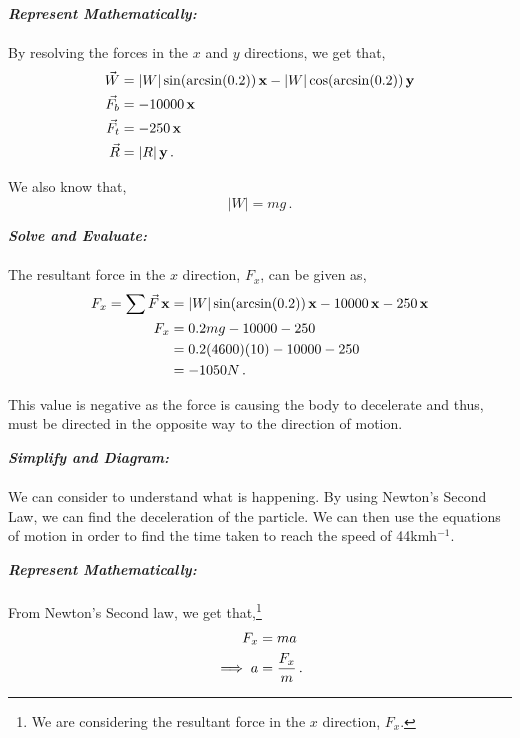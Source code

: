 \begin{subquestions}
\begin{subsubquestions}
\textbf{\textit{Represent Mathematically:}} \\ \\
By resolving the forces in the $x$ and $y$ directions, we get that,
\begin{align}
	\vec{W} & = |W|\sin(\arcsin(0.2))\,\mathbf{x} - |W|\cos(\arcsin(0.2))\,\mathbf{y} \nonumber \\
	\vec{F_b} & = -10000\,\mathbf{x} \nonumber \\
	\vec{F_t} & = -250\,\mathbf{x} \nonumber \\
	\vec{R} & = |R|\,\mathbf{y} \,.
\end{align}

We also know that,
\begin{equation}
	|W|=mg \,.
\end{equation}




\textbf{\textit{Solve and Evaluate:}} \\ \\
The resultant force in the $x$ direction, $F_x$, can be given as,
\begin{align}
	F_x = \sum \vec{F}\,\mathbf{x} & = |W|\sin(\arcsin(0.2))\,\mathbf{x} -10000\,\mathbf{x}-250\,\mathbf{x} \nonumber \\
	F_x & = 0.2mg -10000-250 \nonumber \\
	    & = 0.2(4600)(10) -10000-250 \nonumber \\
	    & = -1050 N \,.
\end{align}

This value is negative as the force is causing the body to decelerate and thus, must be directed in the opposite way to the direction of motion.


\subsubquestion
\textbf{\textit{Simplify and Diagram:}} \\ \\
We can consider  to understand what is happening. By using Newton's Second Law, we can find the deceleration of the particle. We can then use the equations of motion in order to find the time taken to reach the speed of 44kmh$^{-1}$.




\textbf{\textit{Represent Mathematically:}} \\ \\
From Newton's Second law, we get that,\footnote{We are considering the resultant force in the $x$ direction, $F_x$.}
\begin{align}
	F_x & = ma \nonumber \\
	\implies a & = \frac{F_x}{m} \,.
\end{align}


\end{subsubquestions}
\end{subquestions}
